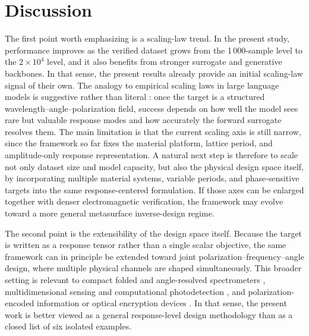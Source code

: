 \section{Discussion}

The first point worth emphasizing is a scaling-law trend. In the present study, performance improves as the verified dataset grows from the 1\,000-sample level to the $2\times10^4$ level, and it also benefits from stronger surrogate and generative backbones. In that sense, the present results already provide an initial scaling-law signal of their own. The analogy to empirical scaling laws in large language models is suggestive rather than literal \cite{kaplan2020scaling}: once the target is a structured wavelength--angle--polarization field, success depends on how well the model sees rare but valuable response modes and how accurately the forward surrogate resolves them. The main limitation is that the current scaling axis is still narrow, since the framework so far fixes the material platform, lattice period, and amplitude-only response representation. A natural next step is therefore to scale not only dataset size and model capacity, but also the physical design space itself, by incorporating multiple material systems, variable periods, and phase-sensitive targets into the same response-centered formulation. If those axes can be enlarged together with denser electromagnetic verification, the framework may evolve toward a more general metasurface inverse-design regime.

The second point is the extensibility of the design space itself. Because the target is written as a response tensor rather than a single scalar objective, the same framework can in principle be extended toward joint polarization--frequency--angle design, where multiple physical channels are shaped simultaneously. This broader setting is relevant to compact folded and angle-resolved spectrometers \cite{faraji2018folded,cai2024angleresolved}, multidimensional sensing and computational photodetection \cite{jiang2024multidimensional}, and polarization-encoded information or optical encryption devices \cite{guo2022stokes}. In that sense, the present work is better viewed as a general response-level design methodology than as a closed list of six isolated examples.
